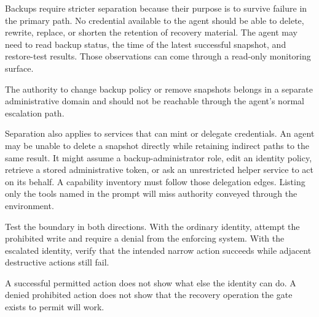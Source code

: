 Backups require stricter separation because their purpose is to survive failure in the primary path. No credential available to the agent should be able to delete, rewrite, replace, or shorten the retention of recovery material. The agent may need to read backup status, the time of the latest successful snapshot, and restore-test results. Those observations can come through a read-only monitoring surface.

The authority to change backup policy or remove snapshots belongs in a separate administrative domain and should not be reachable through the agent's normal escalation path.

Separation also applies to services that can mint or delegate credentials. An agent may be unable to delete a snapshot directly while retaining indirect paths to the same result. It might assume a backup-administrator role, edit an identity policy, retrieve a stored administrative token, or ask an unrestricted helper service to act on its behalf. A capability inventory must follow those delegation edges. Listing only the tools named in the prompt will miss authority conveyed through the environment.

Test the boundary in both directions. With the ordinary identity, attempt the prohibited write and require a denial from the enforcing system. With the escalated identity, verify that the intended narrow action succeeds while adjacent destructive actions still fail.

A successful permitted action does not show what else the identity can do. A denied prohibited action does not show that the recovery operation the gate exists to permit will work.

